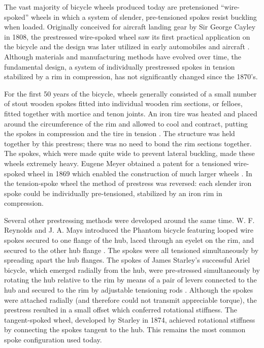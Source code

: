 \documentclass[../thesis.tex]{subfiles}
\begin{document}
The vast majority of bicycle wheels produced today are pretensioned ``wire-spoked'' wheels in which a system of slender, pre-tensioned spokes resist buckling when loaded. Originally conceived for aircraft landing gear by Sir George Cayley in 1808, the prestressed wire-spoked wheel saw its first practical application on the bicycle and the design was later utilized in early automobiles and aircraft \cite{Hadland2014}. Although materials and manufacturing methods have evolved over time, the fundamental design, a system of individually prestressed spokes in tension stabilized by a rim in compression, has not significantly changed since the 1870's.

For the first 50 years of the bicycle, wheels generally consisted of a small number of stout wooden spokes fitted into individual wooden rim sections, or felloes, fitted together with mortice and tenon joints. An iron tire was heated and placed around the circumference of the rim and allowed to cool and contract, putting the spokes in compression and the tire in tension \cite{Sharp1977}. The structure was held together by this prestress; there was no need to bond the rim sections together. The spokes, which were made quite wide to prevent lateral buckling, made these wheels extremely heavy. Eugene Meyer obtained a patent for a tensioned wire-spoked wheel in 1869 which enabled the construction of much larger wheels \cite{Clayton1991}. In the tension-spoke wheel the method of prestress was reversed: each slender iron spoke could be individually pre-tensioned, stabilized by an iron rim in compression.

Several other prestressing methods were developed around the same time. W. F. Reynolds and J. A. Mays introduced the Phantom bicycle featuring looped wire spokes secured to one flange of the hub, laced through an eyelet on the rim, and secured to the other hub flange \cite{Herlihy2004}. The spokes were all tensioned simultaneously by spreading apart the hub flanges. The spokes of James Starley's successful Ariel bicycle, which emerged radially from the hub, were pre-stressed simultaneously by rotating the hub relative to the rim by means of a pair of levers connected to the hub and secured to the rim by adjustable tensioning rods \cite{Caunter1955}. Although the spokes were attached radially (and therefore could not transmit appreciable torque), the prestress resulted in a small offset which conferred rotational stiffness. The tangent-spoked wheel, developed by Starley in 1874, achieved rotational stiffness by connecting the spokes tangent to the hub. This remains the most common spoke configuration used today.
\end{document}
